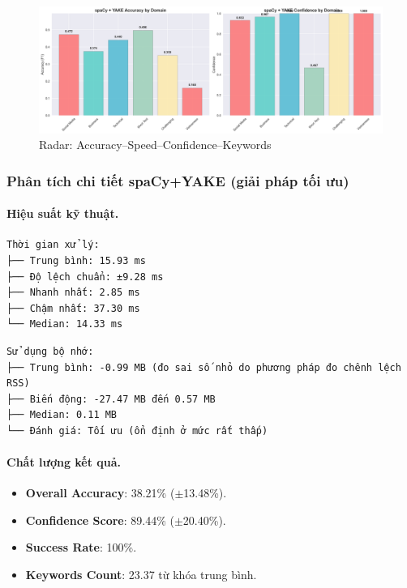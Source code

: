 \begin{figure}[htbp]
  \centering
    \includegraphics[width=\textwidth]{keyword-contents/experiment_visualizations/domain_performance.png}
    \caption{Radar: Accuracy–Speed–Confidence–Keywords}
  \label{fig:overall}
\end{figure}
\newpage


\subsubsection{Phân tích chi tiết \texorpdfstring{spaCy+YAKE}{spaCy+YAKE} (giải pháp tối ưu)}

\paragraph{Hiệu suất kỹ thuật.}
\begin{verbatim}
Thời gian xử lý:
├── Trung bình: 15.93 ms
├── Độ lệch chuẩn: ±9.28 ms
├── Nhanh nhất: 2.85 ms
├── Chậm nhất: 37.30 ms
└── Median: 14.33 ms
\end{verbatim}

\begin{verbatim}
Sử dụng bộ nhớ:
├── Trung bình: -0.99 MB (đo sai số nhỏ do phương pháp đo chênh lệch RSS)
├── Biến động: -27.47 MB đến 0.57 MB
├── Median: 0.11 MB
└── Đánh giá: Tối ưu (ổn định ở mức rất thấp)
\end{verbatim}

\paragraph{Chất lượng kết quả.}
\begin{itemize}
  \item \textbf{Overall Accuracy}: 38.21\% (\(\pm\)13.48\%).
  \item \textbf{Confidence Score}: 89.44\% (\(\pm\)20.40\%).
  \item \textbf{Success Rate}: 100\%.
  \item \textbf{Keywords Count}: 23.37 từ khóa trung bình.
\end{itemize}

